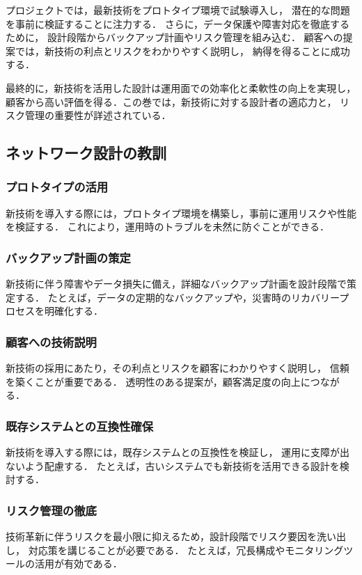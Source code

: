\documentclass[titlepage,a4paper]{jsarticle}
\begin{document}
プロジェクトでは，最新技術をプロトタイプ環境で試験導入し，
潜在的な問題を事前に検証することに注力する．
さらに，データ保護や障害対応を徹底するために，
設計段階からバックアップ計画やリスク管理を組み込む．
顧客への提案では，新技術の利点とリスクをわかりやすく説明し，
納得を得ることに成功する．

最終的に，新技術を活用した設計は運用面での効率化と柔軟性の向上を実現し，
顧客から高い評価を得る．この巻では，新技術に対する設計者の適応力と，
リスク管理の重要性が詳述されている．

\subsection{ネットワーク設計の教訓}
\subsubsection{プロトタイプの活用}
新技術を導入する際には，プロトタイプ環境を構築し，事前に運用リスクや性能を検証する．
これにより，運用時のトラブルを未然に防ぐことができる．

\subsubsection{バックアップ計画の策定}
新技術に伴う障害やデータ損失に備え，詳細なバックアップ計画を設計段階で策定する．
たとえば，データの定期的なバックアップや，災害時のリカバリープロセスを明確化する．

\subsubsection{顧客への技術説明}
新技術の採用にあたり，その利点とリスクを顧客にわかりやすく説明し，
信頼を築くことが重要である．
透明性のある提案が，顧客満足度の向上につながる．

\subsubsection{既存システムとの互換性確保}
新技術を導入する際には，既存システムとの互換性を検証し，
運用に支障が出ないよう配慮する．
たとえば，古いシステムでも新技術を活用できる設計を検討する．

\subsubsection{リスク管理の徹底}
技術革新に伴うリスクを最小限に抑えるため，設計段階でリスク要因を洗い出し，
対応策を講じることが必要である．
たとえば，冗長構成やモニタリングツールの活用が有効である．
\end{document}

